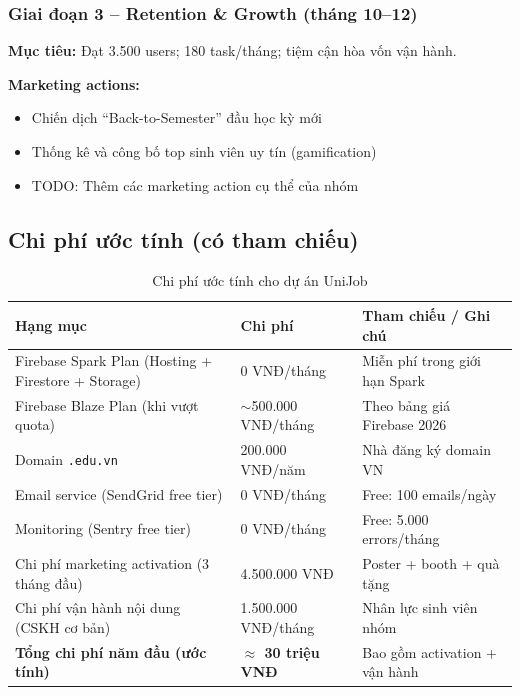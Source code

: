 \subsubsection{Giai đoạn 3 -- Retention \& Growth (tháng 10--12)}

\textbf{Mục tiêu:} Đạt 3.500 users; 180 task/tháng; tiệm cận hòa vốn vận hành.

\textbf{Marketing actions:}
\begin{itemize}
  \item Chiến dịch ``Back-to-Semester'' đầu học kỳ mới
  \item Thống kê và công bố top sinh viên uy tín (gamification)
  \item TODO: Thêm các marketing action cụ thể của nhóm
\end{itemize}

\subsection{Chi phí ước tính (có tham chiếu)}

\begin{table}[H]
\centering
\caption{Chi phí ước tính cho dự án UniJob}
\renewcommand{\arraystretch}{1.5}
\begin{tabularx}{\textwidth}{|X|p{3.2cm}|p{4.2cm}|}
\hline
\textbf{Hạng mục} & \textbf{Chi phí} & \textbf{Tham chiếu / Ghi chú} \\
\hline
Firebase Spark Plan (Hosting + Firestore + Storage) & 0 VNĐ/tháng & Miễn phí trong giới hạn Spark \\
\hline
Firebase Blaze Plan (khi vượt quota) & $\sim$500.000 VNĐ/tháng & Theo bảng giá Firebase 2026 \\
\hline
Domain \texttt{.edu.vn} & 200.000 VNĐ/năm & Nhà đăng ký domain VN \\
\hline
Email service (SendGrid free tier) & 0 VNĐ/tháng & Free: 100 emails/ngày \\
\hline
Monitoring (Sentry free tier) & 0 VNĐ/tháng & Free: 5.000 errors/tháng \\
\hline
Chi phí marketing activation (3 tháng đầu) & 4.500.000 VNĐ & Poster + booth + quà tặng \\
\hline
Chi phí vận hành nội dung (CSKH cơ bản) & 1.500.000 VNĐ/tháng & Nhân lực sinh viên nhóm \\
\hline
\textbf{Tổng chi phí năm đầu (ước tính)} & \textbf{$\approx$ 30 triệu VNĐ} & Bao gồm activation + vận hành \\
\hline
\end{tabularx}
\end{table}

